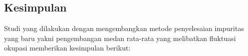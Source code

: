 \chapter{\babLima}

\section{Kesimpulan}

Studi yang dilakukan dengan mengembangkan metode penyelesaian impuritas yang baru yakni pengembangan medan rata-rata yang melibatkan fluktuasi okupasi memberikan kesimpulan berikut:

